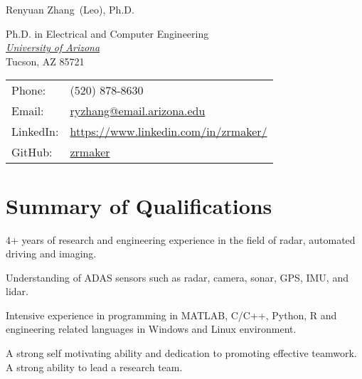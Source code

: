 \documentclass[letterpaper,9pt]{article}
\def\name{Renyuan Zhang}
\renewenvironment{itemize}{
  \begin{list}{}{
    \setlength{\topsep}{0pt}
    \setlength{\itemsep}{0pt}
    \setlength{\parsep}{0pt}
    \setlength{\partopsep}{0pt}
    \setlength{\leftmargin}{1.5em}
  }
}{\end{list}}
\begin{document}
{\huge \name \textnormal \ (Leo), Ph.D.}

\vspace{1em}

\begin{minipage}{0.55\linewidth}
  Ph.D. in Electrical and Computer Engineering \\
  \href{http://www.arizona.edu/}{\it University of Arizona} \\
  Tucson, AZ 85721
\end{minipage}
\begin{minipage}{0.4\linewidth}
  \begin{tabular}{ll}
    Phone: & (520) 878-8630 \\
    Email: & \href{mailto:ryzhang@email.arizona.edu}{ryzhang@email.arizona.edu} \\
    LinkedIn: & \href{https://www.linkedin.com/in/zrmaker/}{https://www.linkedin.com/in/zrmaker/} \\
    GitHub: & \href{https://github.com/zrmaker}{zrmaker}
  \end{tabular}
\end{minipage}

%

\section*{Summary of Qualifications}
\begin{itemize}
  \setlength{\itemindent}{1em}
  \item [$\bullet$] 4+ years of research and engineering experience in the field of radar, automated driving and imaging.
  \item [$\bullet$] Understanding of ADAS sensors such as radar, camera, sonar, GPS, IMU, and lidar.
  \item [$\bullet$] Intensive experience in programming in MATLAB, C/C++, Python, R and engineering related languages in Windows and Linux environment.
  \item [$\bullet$] A strong self motivating ability and dedication to promoting effective teamwork. A strong ability to lead a research team.
\end{itemize}
\end{document}
